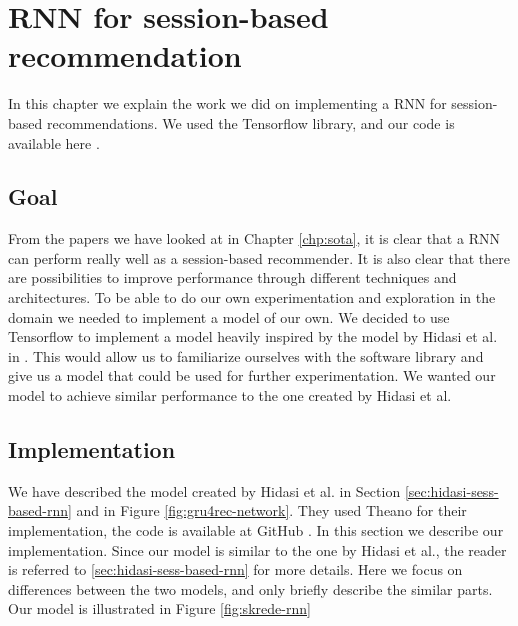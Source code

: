 \chapter{RNN for session-based recommendation}
In this chapter we explain the work we did on implementing a RNN for session-based recommendations. We used the Tensorflow \cite{tensorflow2015-whitepaper} library, and our code is available here \cite{skrede:code}.

\section{Goal}
From the papers we have looked at in Chapter \ref{chp:sota}, it is clear that a RNN can perform really well as a session-based recommender. It is also clear that there are possibilities to improve performance through different techniques and architectures. To be able to do our own experimentation and exploration in the domain we needed to implement a model of our own. We decided to use Tensorflow to implement a model heavily inspired by the model by Hidasi et al. in \cite{DBLP:journals/corr/HidasiKBT15}. This would allow us to familiarize ourselves with the software library and give us a model that could be used for further experimentation. We wanted our model to achieve similar performance to the one created by Hidasi et al.

\section{Implementation}
We have described the model created by Hidasi et al. in Section \ref{sec:hidasi-sess-based-rnn} and in Figure \ref{fig:gru4rec-network}. They used Theano for their implementation, the code is available at GitHub \cite{hidasi:code}. In this section we describe our implementation. Since our model is similar to the one by Hidasi et al., the reader is referred to \ref{sec:hidasi-sess-based-rnn} for more details. Here we focus on differences between the two models, and only briefly describe the similar parts. Our model is illustrated in Figure \ref{fig:skrede-rnn}


